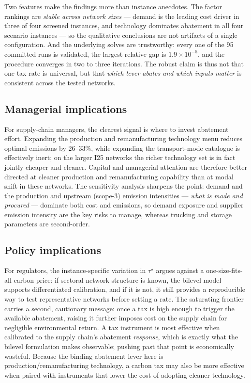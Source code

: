 Two features make the findings more than instance anecdotes. The factor
rankings are \emph{stable across network sizes} --- demand is the leading cost
driver in three of four screened instances, and technology dominates abatement
in all four scenario instances --- so the qualitative conclusions are not
artifacts of a single configuration. And the underlying solves are
trustworthy: every one of the 95 committed runs is validated, the largest
relative gap is $1.9\times10^{-5}$, and the procedure converges in two to
three iterations. The robust claim is thus not that one tax rate is universal,
but that \emph{which lever abates and which inputs matter} is consistent across
the tested networks.

\subsection{Managerial implications}
\label{sec:disc:managerial}

For supply-chain managers, the clearest signal is where to invest abatement
effort. Expanding the production and remanufacturing technology menu reduces
optimal emissions by $26$--$33\%$, while expanding the transport-mode
catalogue is effectively inert; on the larger I25 networks the richer
technology set is in fact jointly cheaper and cleaner. Capital and managerial
attention are therefore better directed at cleaner production and
remanufacturing capability than at modal shift in these networks. The
sensitivity analysis sharpens the point: demand and the production and
upstream (scope-3) emission intensities --- \emph{what is made and procured} ---
dominate both cost and emissions, so demand exposure and supplier emission
intensity are the key risks to manage, whereas trucking and storage parameters
are second-order.

\subsection{Policy implications}
\label{sec:disc:policy}

For regulators, the instance-specific variation in $\tau^{\star}$ argues
against a one-size-fits-all carbon price: if sectoral network structure is
known, the bilevel model supports differentiated calibration, and if it is
not, it still provides a reproducible way to test representative networks
before setting a rate. The saturating frontier carries a second, cautionary
message: once a tax is high enough to trigger the available abatement, raising
it further imposes cost on the supply chain for negligible environmental
return. A tax instrument is most effective when calibrated to the supply
chain's abatement
\emph{response}, which is exactly what the bilevel formulation makes
observable; pushing past that point is economically wasteful. Because the
binding abatement lever here is production/remanufacturing technology, a carbon
tax may also be more effective when paired with instruments that lower the cost
of adopting cleaner technology.

